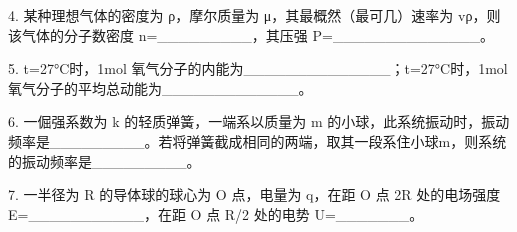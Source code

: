 4. 某种理想气体的密度为 ρ，摩尔质量为 μ，其最概然（最可几）速率为 vρ，则该气体的分子数密度 n=_________，其压强 P=______________。

5. t=27°C时，1mol 氧气分子的内能为______________；t=27°C时，1mol 氧气分子的平均总动能为_____________。

6. 一倔强系数为 k 的轻质弹簧，一端系以质量为 m 的小球，此系统振动时，振动频率是_________。若将弹簧截成相同的两端，取其一段系住小球m，则系统的振动频率是_________。

7. 一半径为 R 的导体球的球心为 O 点，电量为 q，在距 O 点 2R 处的电场强度
E=___________，在距 O 点 R/2 处的电势 U=_______。